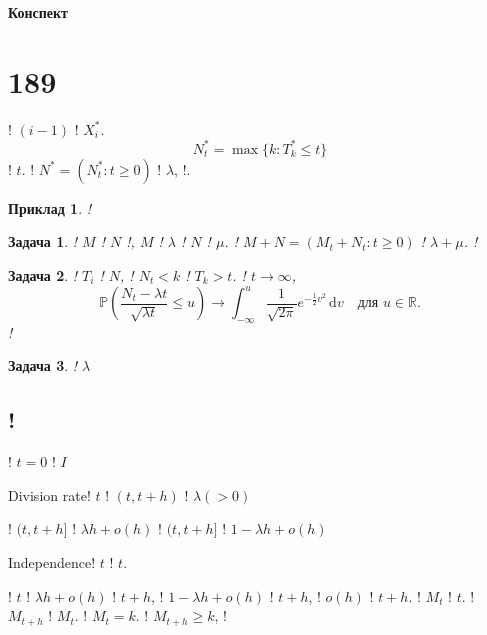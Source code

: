 \documentclass[12pt,fleqn]{article}
\newtheorem{example}{Приклад}[section]
\newtheorem{problem}{Задача}[section]
\numberwithin{figure}{section}
\numberwithin{equation}{section}
\begin{document}
\vspace{50mm}

\begin{center}
\Large\bf
Конспект\\[50mm]
{\Huge}
\end{center}

\vspace{50mm}

\newpage

\tableofcontents


\newpage


\section{189}\label{189}\allowdisplaybreaks

! $(i-1)$ ! $X_{i}^{*}$.
$$N_{t}^{*}=\max\{k: T_{k}^{*}\leq t\}$$
! $t$. ! $N^{*}=(N_{t}^{*}:t\geq 0)$ ! $\lambda$, !.

\begin{example}
    !
\end{example}

\begin{problem}
    ! $M$ ! $N$ !, $M$ ! $\lambda$ ! $N$ ! $\mu$. ! $M + N = (M_t + N_t : t \geq 0)$ ! $\lambda + \mu$. !
\end{problem}

\begin{problem}
  ! $T_i$ ! $N$, ! $N_t < k$ ! $T_k > t$. ! $t \rightarrow \infty$,
  $$ \mathbb{P}(\frac{N_t-\lambda t}{\sqrt{\lambda t}}\leq u)\rightarrow \int_{-\infty}^{u}\frac{1}{\sqrt{2\pi}}e^{-\frac{1}{2}v^2}\, \mathrm{d}v \quad \text{для $u \in \mathbb{R}.$} $$
  !
\end{problem}

\begin{problem}
  ! $\lambda$
\end{problem}

\subsection{!}\label{11.4}
! $t=0$ ! $I$

Division rate! $t$ ! $(t, t + h)$ ! $\lambda (>0)$

! $(t, t+ h]$ ! $\lambda h + o(h)$
! $(t, t+ h]$ ! $1 - \lambda h + o(h)$

Independence! $t$ ! $t$.

! $t$ ! $\lambda h + o(h)$ ! $t+h$, ! $1 - \lambda h + o(h)$ ! $t+h$, ! $o(h)$ ! $t+h$. ! $M_t$ ! $t$. ! $M_{t+h}$ ! $M_t$. ! $M_t = k$. ! $M_{t+h}\geq k$, !
\end{document}
